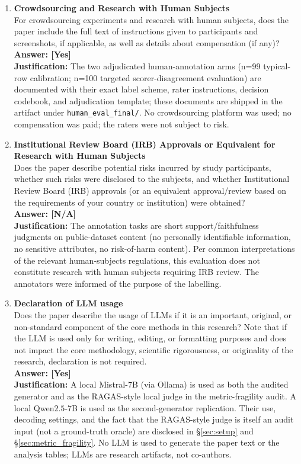 \begin{enumerate}
\item {\bf Crowdsourcing and Research with Human Subjects}\\
For crowdsourcing experiments and research with human subjects, does
the paper include the full text of instructions given to participants
and screenshots, if applicable, as well as details about compensation
(if any)?
\\\textbf{Answer: [Yes]}
\\\textbf{Justification:} The two adjudicated human-annotation arms
(n=99 typical-row calibration; n=100 targeted scorer-disagreement
evaluation) are documented with their exact label scheme, rater
instructions, decision codebook, and adjudication template; these
documents are shipped in the artifact under
\texttt{human\_eval\_final/}. No crowdsourcing platform was used; no
compensation was paid; the raters were not subject to risk.

\item {\bf Institutional Review Board (IRB) Approvals or Equivalent for Research with Human Subjects}\\
Does the paper describe potential risks incurred by study participants,
whether such risks were disclosed to the subjects, and whether
Institutional Review Board (IRB) approvals (or an equivalent approval/review
based on the requirements of your country or institution) were obtained?
\\\textbf{Answer: [N/A]}
\\\textbf{Justification:} The annotation tasks are short
support/faithfulness judgments on public-dataset content (no
personally identifiable information, no sensitive attributes, no
risk-of-harm content). Per common interpretations of the relevant
human-subjects regulations, this evaluation does not constitute
research with human subjects requiring IRB review. The annotators
were informed of the purpose of the labelling.

\item {\bf Declaration of LLM usage}\\
Does the paper describe the usage of LLMs if it is an important,
original, or non-standard component of the core methods in this
research? Note that if the LLM is used only for writing, editing, or
formatting purposes and does not impact the core methodology,
scientific rigorousness, or originality of the research, declaration
is not required.
\\\textbf{Answer: [Yes]}
\\\textbf{Justification:} A local Mistral-7B (via Ollama) is used as
both the audited generator and as the RAGAS-style local judge in the
metric-fragility audit. A local Qwen$2.5$-7B is used as the
second-generator replication. Their use, decoding settings, and the
fact that the RAGAS-style judge is itself an audit input (not a
ground-truth oracle) are disclosed in \S\ref{sec:setup} and
\S\ref{sec:metric_fragility}. No LLM is used to generate the paper
text or the analysis tables; LLMs are research artifacts, not
co-authors.

\end{enumerate}

